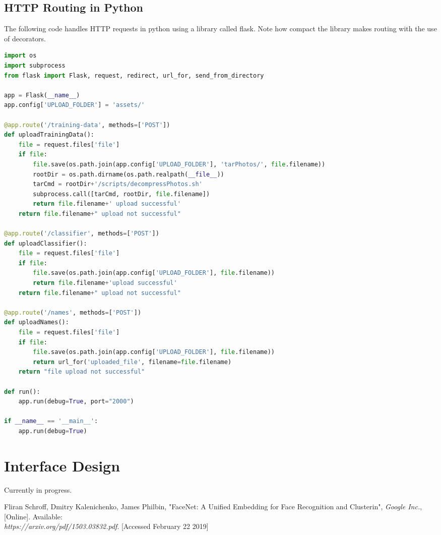 \documentclass[onecolumn, draftclsnofoot,10pt, compsoc]{IEEEtran}
\begin{document}
\subsection{HTTP Routing in Python}
The following code handles HTTP requests in python using a library called flask. Note how compact the library makes routing with the use of decorators.
\begin{lstlisting}[language=Python, caption={Server HTTP Routing using flask}, basicstyle=\scriptsize]
import os
import subprocess
from flask import Flask, request, redirect, url_for, send_from_directory

app = Flask(__name__)
app.config['UPLOAD_FOLDER'] = 'assets/'

@app.route('/training-data', methods=['POST'])
def uploadTrainingData():
    file = request.files['file']
    if file: 
        file.save(os.path.join(app.config['UPLOAD_FOLDER'], 'tarPhotos/', file.filename))
        rootDir = os.path.dirname(os.path.realpath(__file__))
        tarCmd = rootDir+'/scripts/decompressPhotos.sh'
        subprocess.call([tarCmd, rootDir, file.filename])
        return file.filename+' upload successful'
    return file.filename+" upload not successful"

@app.route('/classifier', methods=['POST'])
def uploadClassifier():
    file = request.files['file']
    if file: 
        file.save(os.path.join(app.config['UPLOAD_FOLDER'], file.filename))
        return file.filename+'upload successful'
    return file.filename+" upload not successful"

@app.route('/names', methods=['POST'])
def uploadNames():
    file = request.files['file']
    if file: 
        file.save(os.path.join(app.config['UPLOAD_FOLDER'], file.filename))
        return url_for('uploaded_file', filename=file.filename)
    return "file upload not successful"
    
def run():
    app.run(debug=True, port="2000")

if __name__ == '__main__':
	app.run(debug=True)

\end{lstlisting}


\section{Interface Design}
Currently in progress.

\newpage
\begin{thebibliography}{10}
	
	Fliran Schroff, Dmitry Kalenichenko, James Philbin,
	"FaceNet: A Unified Embedding for Face Recognition and Clusterin",
	\textit{Google Inc.},
	[Online].
	Available: \\\textit{https://arxiv.org/pdf/1503.03832.pdf}.
	[Accessed February 22 2019]
\end{thebibliography}

\end{document}
